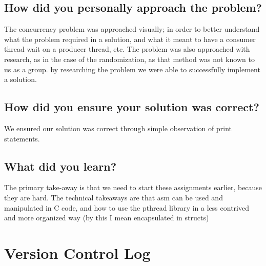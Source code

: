 \documentclass[10pt,letterpaper,onecolumn,draftclsnofoot]{IEEEtran}
\begin{document}
\subsection{How did you personally approach the problem?}
The concurrency problem was approached visually; in order to better understand 
what the problem required in a solution, and what it meant to have a consumer thread
wait on a producer thread, etc. The problem was also approached with research, as in 
the case of the randomization, as that method was not known to us as a group. by 
researching the problem we were able to successfully implement a solution.

\subsection{How did you ensure your solution was correct?}
We ensured our solution was correct through simple observation of print statements.

\subsection{What did you learn?}
The primary take-away is that we need to start these assignments earlier, because they 
are hard. The technical takeaways are that asm can be used and manipulated in C code, 
and how to use the pthread library in a less contrived and more organized way (by this 
I mean encapsulated in structs)

\section{Version Control Log}
\end{document}
